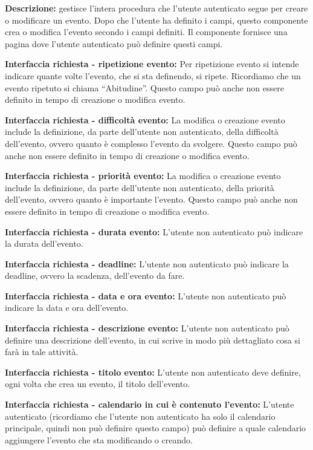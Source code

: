 \begin{listaPersonale}[]{}

    \textbf{Descrizione:} gestisce l'intera procedura che l'utente autenticato segue per creare o modificare un evento. Dopo che l'utente ha definito i campi, questo componente crea o modifica l'evento secondo i campi definiti.  Il componente fornisce una pagina dove l'utente autenticato può definire questi campi.

    \textbf{Interfaccia richiesta - ripetizione evento:} Per ripetizione evento si intende indicare quante volte l'evento, che si sta definendo, si ripete. Ricordiamo che un evento ripetuto si chiama “Abitudine”. Questo campo può anche non essere definito in tempo di creazione o modifica evento.

    \textbf{Interfaccia richiesta - difficoltà evento:} La modifica o creazione evento include la definizione, da parte dell'utente non autenticato, della difficoltà dell'evento, ovvero quanto è complesso l'evento da svolgere. Questo campo può anche non essere definito in tempo di creazione o modifica evento.

    \textbf{Interfaccia richiesta - priorità evento:} La modifica o creazione evento include la definizione, da parte dell'utente non autenticato, della priorità dell'evento, ovvero quanto è importante l'evento. Questo campo può anche non essere definito in tempo di creazione o modifica evento.

    \textbf{Interfaccia richiesta - durata evento:} L'utente non autenticato può indicare la durata dell'evento.

    \textbf{Interfaccia richiesta - deadline:} L'utente non autenticato può indicare la deadline, ovvero la scadenza, dell'evento da fare.

    \textbf{Interfaccia richiesta - data e ora evento:} L'utente non autenticato può indicare la data e ora dell'evento.

    \textbf{Interfaccia richiesta - descrizione evento:} L'utente non autenticato può definire una descrizione dell'evento, in cui scrive in modo più dettagliato cosa si farà in tale attività.

    \textbf{Interfaccia richiesta - titolo evento:} L'utente non autenticato deve definire, ogni volta che crea un evento, il titolo dell'evento.

    \textbf{Interfaccia richiesta - calendario in cui è contenuto l'evento:} L'utente autenticato (ricordiamo che l'utente non autenticato ha solo il calendario principale, quindi non può definire questo campo) può definire a quale calendario aggiungere l'evento che sta modificando o creando.


\end{listaPersonale}
